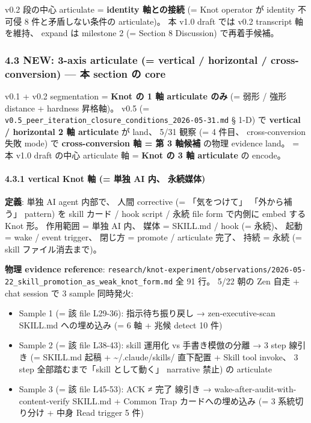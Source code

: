 \documentclass[
]{article}
\providecommand{\tightlist}{%
  \setlength{\itemsep}{0pt}\setlength{\parskip}{0pt}}
\begin{document}
v0.2 段の中心 articulate = \textbf{identity 軸との接続} (= Knot operator
が identity 不可侵 8 件と矛盾しない条件の articulate)。 本 v1.0 draft
では v0.2 transcript 軸を維持、 expand は milestone 2 (= Section 8
Discussion) で再着手候補。

\subsubsection{4.3 NEW: 3-axis articulate (= vertical / horizontal /
cross-conversion) --- 本 section の
core}\label{new-3-axis-articulate-vertical-horizontal-cross-conversion-ux672c-section-ux306e-core}

v0.1 + v0.2 segmentation = \textbf{Knot の 1 軸 articulate のみ} (= 弱形
/ 強形 distance + hardness 昇格軸)。 v0.5 (=
\texttt{v0.5\_peer\_iteration\_closure\_conditions\_2026-05-31.md} §
1-D) で \textbf{vertical / horizontal 2 軸 articulate} が land、 5/31
観察 (= 4 件目、 cross-conversion 失敗 mode) で \textbf{cross-conversion
軸 = 第 3 軸候補} の物理 evidence land。 = 本 v1.0 draft の中心
articulate 軸 = \textbf{Knot の 3 軸 articulate} の encode。

\paragraph{4.3.1 vertical Knot 軸 (= 単独 AI 内、
永続媒体)}\label{vertical-knot-ux8ef8-ux5358ux72ec-ai-ux5185-ux6c38ux7d9aux5a92ux4f53}

\textbf{定義}: 単独 AI agent 内部で、 人間 corrective (= 「気をつけて」
「外から補う」 pattern) を skill カード / hook script / 永続 file form
で内側に embed する Knot 形。 作用範囲 = 単独 AI 内、 媒体 = SKILL.md /
hook (= 永続)、 起動 = wake / event trigger、 閉じ方 = promote /
articulate 完了、 持続 = 永続 (= skill ファイル消去まで)。

\textbf{物理 evidence reference}:
\texttt{research/knot-experiment/observations/2026-05-22\_skill\_promotion\_as\_weak\_knot\_form.md}
全 91 行。 5/22 朝の Zen 自走 + chat session で 3 sample 同時発火:

\begin{itemize}
\tightlist
\item
  Sample 1 (= 該 file L29-36): 指示待ち振り戻し → zen-executive-scan
  SKILL.md への埋め込み (= 6 軸 + 兆候 detect 10 件)
\item
  Sample 2 (= 該 file L38-43): skill 運用化 vs 手書き模倣の分離 → 3 step
  線引き (= SKILL.md 起稿 + \textasciitilde/.claude/skills/ 直下配置 +
  Skill tool invoke、 3 step 全部踏むまで「skill として動く」 narrative
  禁止) の articulate
\item
  Sample 3 (= 該 file L45-53): ACK ≠ 完了 線引き →
  wake-after-audit-with-content-verify SKILL.md + Common Trap
  カードへの埋め込み (= 3 系統切り分け + 中身 Read trigger 5 件)
\end{itemize}
\end{document}
